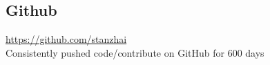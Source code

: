 \documentclass[UTF8,margin,line]{res}
\begin{document}

\begin{resume}

\section{\sc Github}
\url{https://github.com/stanzhai} \\
Consistently pushed code/contribute on GitHub for 600 days


\end{resume}
\end{document}

